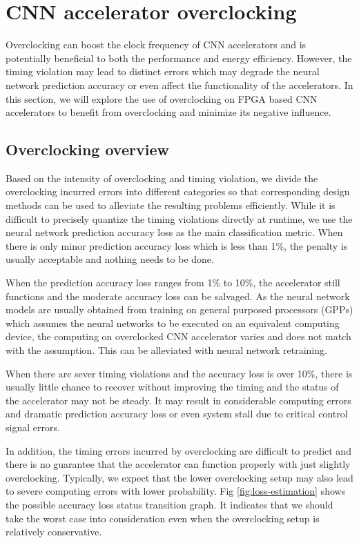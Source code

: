 \section{CNN accelerator overclocking} \label{sec:framework}
Overclocking can boost the clock frequency of CNN accelerators and is potentially beneficial to both 
the performance and energy efficiency. However, the timing violation may lead to distinct errors which 
may degrade the neural network prediction accuracy or even affect the functionality of the accelerators. 
In this section, we will explore the use of overclocking on FPGA based CNN accelerators to benefit from 
overclocking and minimize its negative influence.

\subsection{Overclocking overview}
Based on the intensity of overclocking and timing 
violation, we divide the overclocking incurred errors into different 
categories so that corresponding design methods can be used to 
alleviate the resulting problems efficiently. While it is difficult 
to precisely quantize the timing violations directly at runtime, we use 
the neural network prediction accuracy loss as the main 
classification metric. When there is only minor prediction accuracy 
loss which is less than 1\%, the penalty is usually acceptable 
and nothing needs to be done. 

When the prediction accuracy loss ranges from 1\% to 10\%, the accelerator 
still functions and the moderate accuracy loss can be salvaged. 
As the neural network models are usually obtained 
from training on general purposed processors (GPPs) which assumes the 
neural networks to be executed on an equivalent computing device, 
the computing on overclocked CNN accelerator varies and does not match 
with the assumption. This can be alleviated with neural network retraining.

When there are sever timing violations and 
the accuracy loss is over 10\%, there is usually little chance to recover 
without improving the timing and the status of the accelerator 
may not be steady. It may result in considerable computing errors 
and dramatic prediction accuracy loss 
or even system stall due to critical control signal errors.  

In addition, the timing errors incurred by overclocking are difficult 
to predict and there is no guarantee that the accelerator can function properly 
with just slightly overclocking. Typically, we expect that the lower overclocking setup 
may also lead to severe computing errors with lower probability.
Fig \ref{fig:loss-estimation} shows the possible accuracy loss status 
transition graph. It indicates that we should take the worst case 
into consideration even when the overclocking setup is relatively
conservative.

